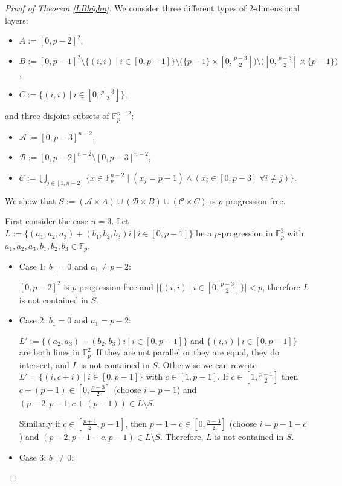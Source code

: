 \documentclass[12pt]{amsart}
\newcommand{\<}{\langle}
\renewcommand{\>}{\rangle}
\numberwithin{equation}{section}
\numberwithin{theorem}{section}
\begin{document}
\begin{proof}[Proof of Theorem \ref{LBhighn}]
We consider three different types of $2$-dimensional layers: 
\begin{itemize}
    \item $A:=[0,p-2]^{2}$,
    \item $B:=[0,p-1]^2\setminus \{(i,i)\ |\ i \in [0,p-1]\}\setminus \big(\{p-1\}\times [0,\frac{p-3}{2}]\big)\setminus  \big([0,\frac{p-3}{2}]\times \{p-1\}\big)$,
    \item $C:= \{(i,i)\ |\ i \in [0,\frac{p-3}{2}]\}$,
\end{itemize}

and three disjoint subsets of $\mathbb{F}_p^{n-2}$:
\begin{itemize}
    \item $\mathcal{A}:=[0,p-3]^{n-2}$,
    \item $\mathcal{B}:=[0,p-2]^{n-2}\setminus [0,p-3]^{n-2}$,
    \item $\mathcal{C}:=\bigcup_{j\in[1,n-2]}\{x\in\mathbb{F}_p^{n-2} \; | \; (x_j=p-1) \land (x_i\in[0,p-3] \; \forall i\neq j)\}.$
\end{itemize}
We show that $S:=(\mathcal{A}\times A)\cup (\mathcal{B}\times B)\cup (\mathcal{C}\times C) $ is $p$-progression-free.

First consider the case $n=3$.
Let  $L:=\{(a_1,a_2,a_3)+(b_1,b_2,b_3)i \ |\  i\in [0,p-1]\}$ be a $p$-progression in $\mathbb{F}_p^3$ with $a_1,a_2,a_3,b_1,b_2,b_3\in\mathbb{F}_p$.
\begin{itemize}

\item Case 1: $b_1=0$ and $a_1\neq p-2:$

\noindent
$[0,p-2]^2$ is $p$-progression-free and $|\{(i,i)\ |\ i \in [0,\frac{p-3}{2}]\}|<p$, therefore $L$ is not contained in $S$.
\smallskip
\item Case 2: $b_1=0$ and $a_1= p-2:$

\noindent
$L':=\{(a_2,a_3)+(b_2,b_3)i\ |\ i\in [0,p-1]\}$ and $\{(i,i)\ |\ i \in [0,p-1]\}$ are both lines in $\mathbb{F}_p^2$. If they are not parallel or they are equal, they do intersect, and $L$ is not contained in $S$. Otherwise we can rewrite $L'=\{(i,c+i)\ |\ i\in [0,p-1]\}$ with $c\in [1,p-1].$ If $c\in [1,\frac{p-1}{2}]$ then  $c+(p-1)\in[0,\frac{p-3}{2}]$ (choose $i=p-1$) and $(p-2,p-1,c+(p-1))\in L\setminus S.$

Similarly if $c\in [\frac{p+1}{2},p-1]$, then $p-1-c\in[0,\frac{p-3}{2}]$ (choose $i=p-1-c$) and $(p-2,p-1-c,p-1)\in L\setminus S.$ Therefore, $L$ is not contained in $S$.
\smallskip
\item Case 3: $b_1\neq 0$:


\end{itemize}
\end{proof}
\end{document}
